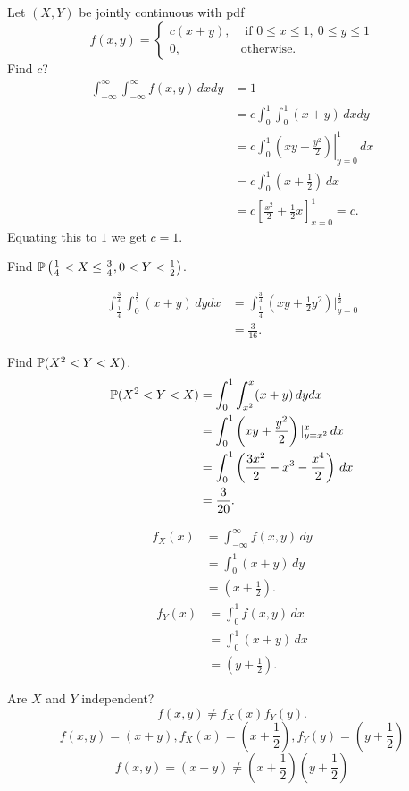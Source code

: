 \documentclass[10pt, a4paper]{article}
\begin{document}
\begin{example}
    Let $(X, Y)$ be jointly continuous with pdf
    \[
    f(x, y) = \begin{cases}
        c(x + y), &\text{ if } 0 \leq x \leq 1,\ 0 \leq y \leq 1 \\
        0, &\text{otherwise}.
    \end{cases}
    \]
    Find $c$?
    \begin{align*}
        \int_{-\infty}^{\infty}\int_{-\infty}^{\infty}f(x, y)\,dxdy &= 1 \\
        &= c\int_{0}^{1}\int_{0}^{1}(x + y)\,dxdy \\
        &= c\int_{0}^{1}\left.\left(xy + \frac{y ^ 2}{2}\right)\right|_{y = 0}^{1}\,dx \\
        &= c\int_{0}^{1}\left(x + \frac{1}{2}\right)\,dx \\
        &= c\left[\frac{x ^ 2}{2} + \frac{1}{2}x\right]_{x = 0}^{1} = c.
    \end{align*}
    Equating this to $1$ we get $c = 1$.

    Find $\P\left(\frac{1}{4} < X \leq \frac{3}{4}, 0 < Y < \frac{1}{2}\right)$.

    \begin{align*}
        \int_{\frac{1}{4}}^{\frac{3}{4}}\int_{0}^{\frac{1}{2}}(x + y)\,dydx &= \int_{\frac{1}{4}}^{\frac{3}{4}}\left(xy + \frac{1}{2}y ^ 2\right)|_{y = 0}^{\frac{1}{2}} \\
        &= \frac{3}{16}.
    \end{align*}

    Find $\P(X ^ 2 < Y < X)$.
    \begin{align*}
        \P(X ^ 2 < Y < X) &= \int_{0}^{1}\int_{x ^ 2}^{x}(x + y)\,dydx \\
        &= \int_{0}^{1}\left(xy + \frac{y ^ 2}{2}\right)|_{y = x ^ 2}^{x}\,dx \\
        &= \int_{0}^{1}\left(\frac{3x ^ 2}{2} - x ^ 3 - \frac{x ^ 4}{2}\right)\,dx \\
        &= \frac{3}{20}.
    \end{align*}

    \begin{align*}
        f_X(x) &= \int_{-\infty}^{\infty}f(x, y)\,dy \\
        &= \int_{0}^{1}(x + y)\,dy \\
        &= \left(x + \frac{1}{2}\right).
    \end{align*}
    \begin{align*}
        f_Y(x) &= \int_{0}^{1}f(x, y)\,dx \\
        &= \int_{0}^{1}(x + y)\,dx \\
        &= \left(y + \frac{1}{2}\right).
    \end{align*}

    Are $X$ and $Y$ independent?
    \[
    f(x, y) \neq f_X(x)f_Y(y).
    \]
    \[
    f(x, y) = (x + y), f_X(x) = \left(x + \frac{1}{2}\right), f_Y(y) = \left(y + \frac{1}{2}\right)
    \]
    \[
    f(x, y) = (x + y) \neq \left(x + \frac{1}{2}\right)\left(y + \frac{1}{2}\right)
    \]
\end{example}
\end{document}
